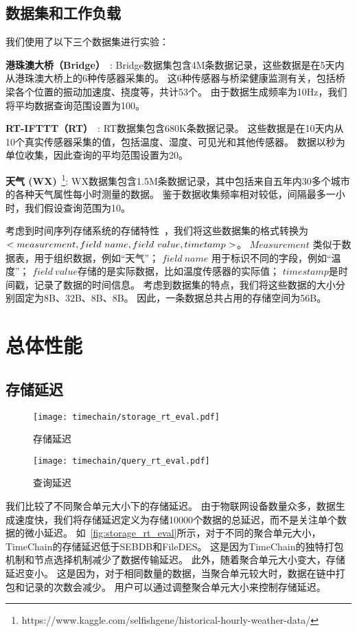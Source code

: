 \subsection{数据集和工作负载}

我们使用了以下三个数据集进行实验：

\textbf{港珠澳大桥（Bridge）}~\cite{zhang2023edge}:
Bridge数据集包含4M条数据记录，这些数据是在5天内从港珠澳大桥上的6种传感器采集的。
这6种传感器与桥梁健康监测有关，包括桥梁各个位置的振动加速度、挠度等，共计53个。
由于数据生成频率为10Hz，我们将平均数据查询范围设置为100。

\textbf{RT-IFTTT（RT）}~\cite{heo2017rt}:
RT数据集包含680K条数据记录。
这些数据是在10天内从10个真实传感器采集的值，包括温度、湿度、可见光和其他传感器。
数据以秒为单位收集，因此查询的平均范围设置为20。

\textbf{天气 (WX)}~\footnote{https://www.kaggle.com/selfishgene/historical-hourly-weather-data/}:
WX数据集包含1.5M条数据记录，其中包括来自五年内30多个城市的各种天气属性每小时测量的数据。
鉴于数据收集频率相对较低，间隔最多一小时，我们假设查询范围为10。

考虑到时间序列存储系统的存储特性~\cite{naqvi2017time}，我们将这些数据集的格式转换为 $<measurement,\\ field~name, field~value, timetamp>$。
$Measurement$ 类似于数据表，用于组织数据，例如“天气”；
$field~name$ 用于标识不同的字段，例如“温度”；
$field~value$存储的是实际数据，比如温度传感器的实际值；
$timestamp$是时间戳，记录了数据的时间信息。
考虑到数据集的特点，我们将这些数据的大小分别固定为8B、32B、8B、8B。
因此，一条数据总共占用的存储空间为56B。

\section{总体性能}

\subsection{存储延迟}
\begin{figure*}[t]
    \centering
	\begin{minipage}{0.48\linewidth}
        \centering
        \texttt{[image: timechain/storage\_rt\_eval.pdf]}
        \caption{存储延迟}
        \label{fig:storage_rt_eval}
    \end{minipage}
    \quad
    \begin{minipage}{0.48\linewidth}
        \centering
        \texttt{[image: timechain/query\_rt\_eval.pdf]}
        \caption{查询延迟}
        \label{fig:query_rt_eval}
	\end{minipage}
\end{figure*}
我们比较了不同聚合单元大小下的存储延迟。
由于物联网设备数量众多，数据生成速度快，我们将存储延迟定义为存储10000个数据的总延迟，而不是关注单个数据的微小延迟。
如~\autoref{fig:storage_rt_eval}所示，对于不同的聚合单元大小，TimeChain的存储延迟低于SEBDB和FileDES。
这是因为TimeChain的独特打包机制和节点选择机制减少了数据传输延迟。
此外，随着聚合单元大小变大，存储延迟变小。
这是因为，对于相同数量的数据，当聚合单元较大时，数据在链中打包和记录的次数会减少。
用户可以通过调整聚合单元大小来控制存储延迟。


